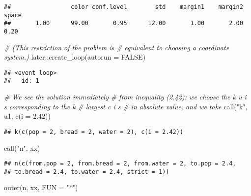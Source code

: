 \documentclass[
]{article}
\newenvironment{Shaded}{\begin{snugshade}}{\end{snugshade}}
\newcommand{\AttributeTok}[1]{\textcolor[rgb]{0.77,0.63,0.00}{#1}}
\newcommand{\CommentTok}[1]{\textcolor[rgb]{0.56,0.35,0.01}{\textit{#1}}}
\newcommand{\ConstantTok}[1]{\textcolor[rgb]{0.00,0.00,0.00}{#1}}
\newcommand{\FloatTok}[1]{\textcolor[rgb]{0.00,0.00,0.81}{#1}}
\newcommand{\FunctionTok}[1]{\textcolor[rgb]{0.00,0.00,0.00}{#1}}
\newcommand{\NormalTok}[1]{#1}
\newcommand{\SpecialCharTok}[1]{\textcolor[rgb]{0.00,0.00,0.00}{#1}}
\newcommand{\StringTok}[1]{\textcolor[rgb]{0.31,0.60,0.02}{#1}}
\begin{document}
\begin{verbatim}
##                 color conf.level        std    margin1    margin2      space 
##       1.00      99.00       0.95      12.00       1.00       2.00       0.20
\end{verbatim}

\begin{Shaded}
\begin{Highlighting}[]
\CommentTok{\# (This restriction of the problem is}
\CommentTok{\# equivalent to choosing a coordinate system.)}
\NormalTok{later}\SpecialCharTok{::}\FunctionTok{create\_loop}\NormalTok{(}\AttributeTok{autorun =} \ConstantTok{FALSE}\NormalTok{)}
\end{Highlighting}
\end{Shaded}

\begin{verbatim}
## <event loop>
##   id: 1
\end{verbatim}

\begin{Shaded}
\begin{Highlighting}[]
\CommentTok{\# We see the solution immediately}
\CommentTok{\# from inequality (2.42): we choose the k u i s corresponding to the k }
\CommentTok{\# largest c i s}
\CommentTok{\# in absolute value, and we take}
\FunctionTok{call}\NormalTok{(}\StringTok{"k"}\NormalTok{, u1, }\FunctionTok{c}\NormalTok{(}\AttributeTok{i =} \FloatTok{2.42}\NormalTok{))}
\end{Highlighting}
\end{Shaded}

\begin{verbatim}
## k(c(pop = 2, bread = 2, water = 2), c(i = 2.42))
\end{verbatim}

\begin{Shaded}
\begin{Highlighting}[]
\FunctionTok{call}\NormalTok{(}\StringTok{"n"}\NormalTok{, xx)}
\end{Highlighting}
\end{Shaded}

\begin{verbatim}
## n(c(from.pop = 2, from.bread = 2, from.water = 2, to.pop = 2.4, 
## to.bread = 2.4, to.water = 2.4, strict = 1))
\end{verbatim}

\begin{Shaded}
\begin{Highlighting}[]
\FunctionTok{outer}\NormalTok{(n, xx, }\AttributeTok{FUN =} \StringTok{"*"}\NormalTok{)}
\end{Highlighting}
\end{Shaded}
\end{document}
